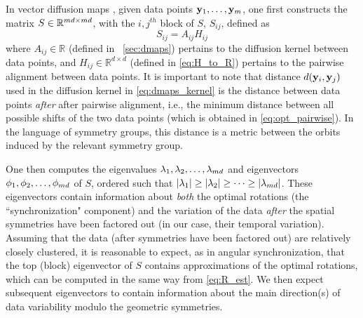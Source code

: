 In vector diffusion maps \cite{singer2012vector}, given data points $\mathbf{y}_1, \dots, \mathbf{y}_m$, one first constructs the matrix $S \in \mathbb{R}^{m d \times m d}$, with the $i,j^{th}$ block of $S$, $S_{ij}$, defined as
\begin{equation} \label{eq:vdm_S}
	S_{ij} = A_{ij} H_{ij}
\end{equation}
%
where $A_{ij} \in \mathbb{R}$ (defined in \sec~\ref{sec:dmaps}) pertains to the diffusion kernel between data points, and $H_{ij} \in \mathbb{R}^{d \times d}$ (defined in \eqref{eq:H_to_R}) pertains to the pairwise alignment between data points.
%
It is important to note that distance $d(\mathbf{y}_i, \mathbf{y}_j)$ used in the diffusion kernel in \eqref{eq:dmaps_kernel} is the distance between data points {\it after} after pairwise alignment, i.e., the minimum distance between all possible shifts of the two data points (which is obtained in \eqref{eq:opt_pairwise}).
%
In the language of symmetry groups, this distance is a metric between the orbits induced by the relevant symmetry group.

One then computes the eigenvalues $\lambda_1, \lambda_2, \dots, \lambda_{m d}$ and eigenvectors $\phi_1, \phi_2, \dots, \phi_{m d}$ of $S$, ordered such that $|\lambda_1| \ge |\lambda_2| \ge \dots \ge |\lambda_{m d}|$.
%
These eigenvectors contain information about {\it both} the optimal rotations (the ``synchronization" component) and the
variation of the data {\it after} the spatial symmetries have been factored out (in our case, their temporal variation).
%
Assuming that the data (after symmetries have been factored out) are relatively closely clustered, it is reasonable
to expect, as in angular synchronization, that the top (block) eigenvector of $S$ contains approximations of the optimal rotations,
which can be computed in the same way from \eqref{eq:R_est}.
%
We then expect subsequent eigenvectors to contain information about the main direction(s) of data variability modulo the geometric symmetries.

